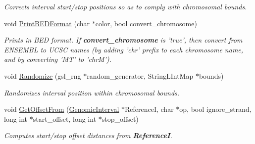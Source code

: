 \begin{CompactItemize}
\begin{CompactList}\small\item\em Corrects interval start/stop positions so as to comply with chromosomal bounds. \item\end{CompactList}\item 
\hypertarget{classGenomicInterval_c06925f3fcf6b47cec5c6f95aaa379c0}{
void \hyperlink{classGenomicInterval_c06925f3fcf6b47cec5c6f95aaa379c0}{PrintBEDFormat} (char $\ast$color, bool convert\_\-chromosome)}
\label{classGenomicInterval_c06925f3fcf6b47cec5c6f95aaa379c0}

\begin{CompactList}\small\item\em Prints in BED format. If {\bf convert\_\-chromosome} is 'true', then convert from ENSEMBL to UCSC names (by adding 'chr' prefix to each chromosome name, and by converting 'MT' to 'chrM'). \item\end{CompactList}\item 
\hypertarget{classGenomicInterval_75aed02c1df83acb5d7ec89e2a9949bd}{
void \hyperlink{classGenomicInterval_75aed02c1df83acb5d7ec89e2a9949bd}{Randomize} (gsl\_\-rng $\ast$random\_\-generator, StringLIntMap $\ast$bounds)}
\label{classGenomicInterval_75aed02c1df83acb5d7ec89e2a9949bd}

\begin{CompactList}\small\item\em Randomizes interval position within chromosomal bounds. \item\end{CompactList}\item 
void \hyperlink{classGenomicInterval_ab40ad7dd997948e0c04a13164e955d6}{GetOffsetFrom} (\hyperlink{classGenomicInterval}{GenomicInterval} $\ast$ReferenceI, char $\ast$op, bool ignore\_\-strand, long int $\ast$start\_\-offset, long int $\ast$stop\_\-offset)
\begin{CompactList}\small\item\em Computes start/stop offset distances from {\bf ReferenceI}. \item\end{CompactList}\end{CompactItemize}
